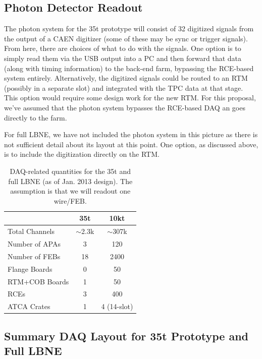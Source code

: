 \subsection{Photon Detector Readout}


The photon system for the 35t prototype will consist of 32 digitized signals from the output of a CAEN digitizer (some of these may be sync or trigger signals).  From here, there are choices of what to do with the signals.  One option is to simply read them via the USB output into a PC and then forward that data (along with timing information) to the back-end farm, bypassing the RCE-based system entirely.  Alternatively, the digitized signals could be routed to an RTM (possibly in a separate slot) and integrated with the TPC data at that stage.  This option would require some design work for the new RTM.  For this proposal, we've assumed that the photon system bypasses the RCE-based DAQ an goes directly to the farm.  

For full LBNE, we have not included the photon system in this picture as there is not sufficient detail about its layout at this point.   One option, as discussed above, is to include the digitization directly on the RTM.  

\begin{table}[tbh]
\begin{center}
\begin{tabular}{|l|c|c|}   
\hline \hline 
    & 35t  & 10kt \\      
\hline
   Total Channels        & $\sim$2.3k &$\sim$307k \\ 
	Number of APAs     &  3     &    120        \\ 
   Number of FEBs       & 18 & 2400 \\ 
   Flange Boards    & 0   & 50 \\ 
   RTM+COB Boards    & 1  &  50  \\
  RCEs                       & 3  &  400  \\
   ATCA Crates            & 1   &  4 (14-slot)   \\ 
\hline \hline
\end{tabular}
\caption[]{DAQ-related quantities for the 35t and full LBNE (as of Jan. 2013 design).  The assumption is that we will readout one wire/FEB.}
\label{tab:daqsumm} 
\end{center}
\end{table}



\subsection{Summary DAQ Layout for 35t Prototype and Full LBNE}

